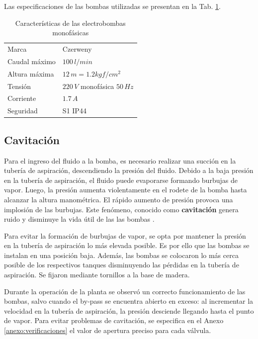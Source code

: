Las especificaciones de las bombas utilizadas se presentan en la Tab.
\ref{tab:caractBombas}.

\begin{table}[ht]
\renewcommand{\arraystretch}{1.3}
\centering
\begin{tabular}{|l|l|}
\hline
Marca & Czerweny\\
Caudal máximo &  $100\,l/min$\\
Altura máxima &  $12\,m = 1.2 kgf/cm^2$\\
Tensión & $220\,V$ monofásica $50\,Hz$\\
Corriente & $1.7\,A$\\
Seguridad & S1 IP44\\
\hline
\end{tabular}
\caption{Características de las electrobombas monofásicas}
\label{tab:caractBombas}
\end{table}

\subsection{Cavitación}
\label{subsec:cavitacion}
Para el ingreso del fluido a la bomba, es necesario realizar una succión
en la tubería de aspiración, descendiendo la presión del fluido.
Debido a la baja presión en la tubería de aspiración, el fluido puede
evaporarse formando burbujas de vapor.
Luego, la presión aumenta violentamente en el rodete de la bomba hasta alcanzar
la altura manométrica.
El rápido aumento de presión provoca una implosión de las burbujas.
Este fenómeno, conocido como \textbf{cavitación} genera ruido y disminuye la
vida útil de las las bombas \cite{bib:ApuntesMDFBombas}.

Para evitar la formación de burbujas de vapor, se opta por mantener la presión
en la tubería de aspiración lo más elevada posible.
Es por ello que las bombas se instalan en una posición baja.
Además, las bombas se colocaron lo más cerca posible de los respectivos
tanques disminuyendo las pérdidas en la tubería de aspiración.
Se fijaron mediante tornillos a la base de madera.

Durante la operación de la planta se observó un correcto funcionamiento de las
bombas, salvo cuando el by-pass se encuentra abierto en exceso: al
incrementar la
velocidad en la tubería de aspiración, la presión desciende llegando hasta el
punto de vapor.
Para evitar problemas de cavitación, se especifica en el Anexo
\ref{anexo:verificaciones} el valor de apertura preciso para cada válvula.


